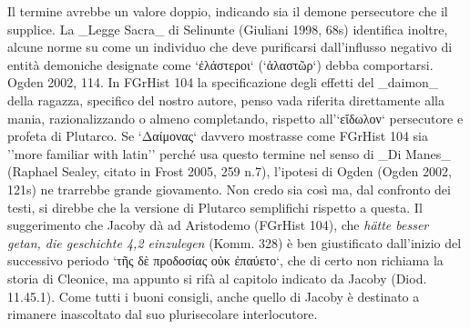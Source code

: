             Il termine avrebbe un valore doppio, indicando sia il demone persecutore che il supplice. La _Legge Sacra_ di Selinunte (Giuliani 1998, 68s) identifica inoltre, alcune norme su come un individuo che deve purificarsi dall'influsso negativo di entità demoniche designate come `ἐλάστεροι` (`ἀλαστῶρ`) debba comportarsi. Ogden 2002, 114. In FGrHist 104 la specificazione degli effetti del _daimon_ della ragazza, specifico del nostro autore, penso vada riferita direttamente alla mania, razionalizzando o almeno completando, rispetto all'`εἴδωλον` persecutore e profeta di Plutarco. Se `Δαίμονας` davvero mostrasse come FGrHist 104 sia ''more familiar with latin'' perché usa questo termine nel senso di _Di Manes_ (Raphael Sealey, citato in Frost 2005, 259 n.7), l'ipotesi di Ogden (Ogden 2002, 121s) ne trarrebbe grande giovamento. Non credo sia così ma, dal confronto dei testi, si direbbe che  la versione di Plutarco semplifichi rispetto a questa.  
            Il suggerimento che Jacoby dà ad Aristodemo (FGrHist 104), che \emph{hätte besser getan, die geschichte 4,2 einzulegen} (Komm. 328) è ben giustificato dall'inizio del successivo periodo `τῆς δὲ προδοσίας οὐκ ἐπαύετο`, che di certo non richiama la storia di Cleonice, ma appunto si rifà al capitolo indicato da Jacoby (Diod. 11.45.1). Come tutti i buoni consigli, anche quello di Jacoby è destinato a rimanere inascoltato dal suo plurisecolare interlocutore.
